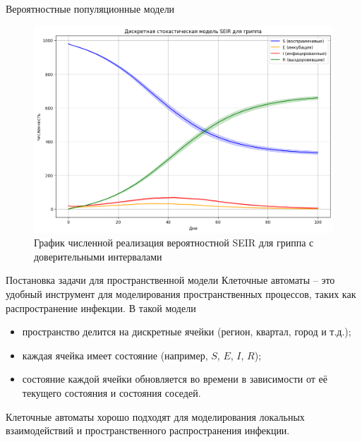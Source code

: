 \documentclass[notheorems]{beamer}
\begin{document}

\begin{frame}
	{Вероятностные популяционные модели}
	\begin{figure}
		\centering
		\includegraphics[scale=0.4]{images/graph02}
		\caption{График численной реализация вероятностной SEIR для гриппа с доверительными интервалами}
		\label{fig:graph02}
	\end{figure}
	
\end{frame}


\begin{frame}
	{Постановка задачи для пространственной модели}
	Клеточные автоматы -- это удобный инструмент для моделирования пространственных процессов, таких как распространение инфекции. В такой модели
	
	\begin{itemize}
		\item пространство делится на дискретные ячейки (регион, квартал, город и т.д.);
		\item каждая ячейка имеет состояние (например, $S$, $E$, $I$, $R$);
		\item состояние каждой ячейки обновляется во времени в зависимости от её текущего состояния и состояния соседей.
	\end{itemize}
	
	Клеточные автоматы хорошо подходят для моделирования локальных взаимодействий и пространственного распространения инфекции.
\end{frame}
\end{document}
